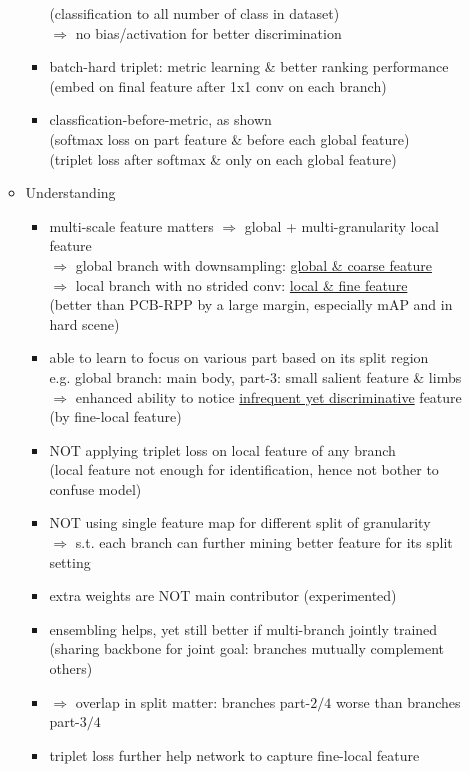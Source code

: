 \begin{itemize}
\begin{itemize}
\begin{itemize}
		(classification to all number of class in dataset) \\
		$\Rightarrow$ no bias/activation for better discrimination
		\item batch-hard triplet: metric learning \& better ranking performance \\
		(embed on final feature after 1x1 conv on each branch)
		\item classfication-before-metric, as shown \\
		(softmax loss on part feature \& before each global feature) \\
		(triplet loss after softmax \& only on each global feature) \\
		\end{itemize}
	\item Understanding
		\begin{itemize}
		\item multi-scale feature matters $\Rightarrow$ global + multi-granularity local feature \\
		$\Rightarrow$ global branch with downsampling: \underline{global \& coarse feature} \\
		$\Rightarrow$ local branch with no strided conv: \underline{local \& fine feature} \\
		(better than PCB-RPP by a large margin, especially mAP and in hard scene)
		\item able to learn to focus on various part based on its split region \\
		e.g. global branch: main body, part-$3$: small salient feature \& limbs \\
		$\Rightarrow$ enhanced ability to notice \underline{infrequent yet discriminative} feature \\
		(by fine-local feature)
		\item NOT applying triplet loss on local feature of any branch \\
		(local feature not enough for identification, hence not bother to confuse model)
		\item NOT using single feature map for different split of granularity \\
		$\Rightarrow$ s.t. each branch can further mining better feature for its split setting
		\item extra weights are NOT main contributor (experimented)
		\item ensembling helps, yet still better if multi-branch jointly trained \\
		(sharing backbone for joint goal: branches mutually complement others)
		\item $\Rightarrow$ overlap in split matter: branches part-$2/4$ worse than branches part-$3/4$
		\item triplet loss further help network to capture fine-local feature
		\end{itemize}
	\end{itemize}
\end{itemize}

